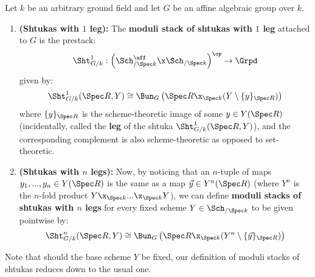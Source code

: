                 \begin{definition} \label{def: schematic_shtukas}
                    Let $k$ be an arbitrary ground field and let $G$ be an affine algebraic group over $k$.
                        \begin{enumerate}
                            \item \textbf{(Shtukas with $1$ leg):} The \textbf{moduli stack of shtukas with $1$ leg} attached to $G$ is the prestack:
                                $$\Sht^1_{G/k}: \left(\Sch^{\aff}_{/\Spec k} \x \Sch_{/\Spec k}\right)^{\op} \to \Grpd$$
                            given by:
                                $$\Sht^1_{G/k}(\Spec R, Y) \cong \Bun_G\left(\Spec R \x_{\Spec k} (Y \setminus \{y\}_{\Spec R})\right)$$
                            where $\{y\}_{\Spec R}$ is the scheme-theoretic image of some $y \in Y(\Spec R)$ (incidentally, called the \textbf{leg} of the shtuka $\Sht^1_{G/k}(\Spec R, Y)$), and the corresponding complement is also scheme-theoretic as opposed to set-theoretic. 
                            \item \textbf{(Shtukas with $n$ legs):} Now, by noticing that an $n$-tuple of maps $y_1, ..., y_n \in Y(\Spec R)$ is the same as a map $\vec{y} \in Y^n(\Spec R)$ (where $Y^n$ is the $n$-fold product $Y \x_{\Spec k} ... \x_{\Spec k} Y$), we can define \textbf{moduli stacks of shtukas with $n$ legs} for every fixed scheme $Y \in \Sch_{/\Spec k}$ to be given pointwise by:
                                $$\Sht^n_{G/k}(\Spec R, Y) \cong \Bun_G\left(\Spec R \x_{\Spec k} (Y^n \setminus \{\vec{y}\}_{\Spec R})\right)$$
                        \end{enumerate} 
                    Note that should the base scheme $Y$ be fixed, our definition of moduli stacks of shtukas reduces down to the usual one.
                \end{definition} 
                
